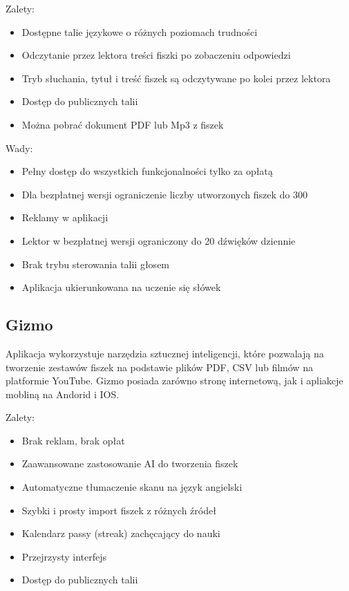 Zalety:
\begin{itemize}[label=-]
    \item Dostępne talie językowe o różnych poziomach trudności
    \item Odczytanie przez lektora treści fiszki po zobaczeniu odpowiedzi
    \item Tryb słuchania, tytuł i treść fiszek są odczytywane po kolei przez lektora
    \item Dostęp do publicznych talii
    \item Można pobrać dokument PDF lub Mp3 z fiszek
    \end{itemize}

Wady:
\begin{itemize}[label=-]
    \item Pełny dostęp do wszystkich funkcjonalności tylko za opłatą
    \item Dla bezpłatnej wersji ograniczenie liczby utworzonych fiszek do 300
    \item Reklamy w aplikacji
    \item Lektor w bezpłatnej wersji ograniczony do 20 dźwięków dziennie
    \item Brak trybu sterowania talii głosem
    \item Aplikacja ukierunkowana na uczenie się słówek
    \end{itemize}

\subsection{Gizmo}

Aplikacja wykorzystuje narzędzia sztucznej inteligencji, które pozwalają na tworzenie zestawów fiszek na podstawie plików PDF, CSV lub filmów na platformie YouTube. Gizmo posiada zarówno stronę internetową, jak i apliakcje mobliną na Andorid i IOS.

Zalety:
\begin{itemize}[label=-]
    \item Brak reklam, brak opłat
    \item Zaawansowane zastosowanie AI do tworzenia fiszek
    \item Automatyczne tłumaczenie skanu na język angielski
    \item Szybki i prosty import fiszek z różnych źródeł
    \item Kalendarz passy (streak) zachęcający do nauki
    \item Przejrzysty interfejs
    \item Dostęp do publicznych talii
    \end{itemize}

